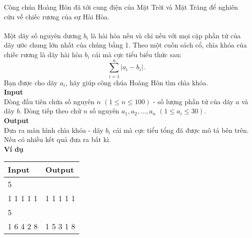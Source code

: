 Công chúa Hoàng Hôn đã tới cung điện của Mặt Trời và Mặt Trăng để nghiên cứu về chiếc rương của sự Hài Hòa.
\\
\\
Một dãy số nguyên dương $b_{i}$ là hài hòa nếu và chỉ nếu với mọi cặp phần tử của dãy ước chung lớn nhất của chúng bằng 1. Theo một cuốn sách cổ, chìa khóa của chiếc rương là dãy hài hòa $b_{i}$ cái mà cực tiểu biểu thức sau:
\[
    \sum_{i = 1}^{n} |a_{i} - b_{i}|.
\]
Bạn được cho dãy $a_{i}$, hãy giúp công chúa Hoàng Hôn tìm chìa khóa.
\\

\textbf{Input}
\\
Dòng đầu tiên chứa số nguyên $n$ $(1 \leq n \leq 100)$ - số lượng phần tử của dãy $a$ và dãy $b$. Dòng tiếp theo chứ $n$ số nguyên $a_{1},a_{2},...,a_{n}$ $(1 \leq a_{i} \leq 30)$.
\\

\textbf{Output}
\\
Đưa ra màn hình chìa khóa - dãy $b_{i}$ cái mà cực tiểu tổng đã được mô tả bên trên. Nếu có nhiều kết quả đưa ra bất kì.
\\

\textbf{Ví dụ}
\begin{table}[h!]
    \begin{center}
        \begin{tabular}{|p{7cm}|p{5cm}|}
            \hline
            \textbf{Input} & \textbf{Output} \\ 
            \hline
            5 & \\
            1 1 1 1 1 & 1 1 1 1 1 \\
            \hline
            5 & \\
            1 6 4 2 8 & 1 5 3 1 8 \\
            \hline
        \end{tabular}
    \end{center}
\end{table}


